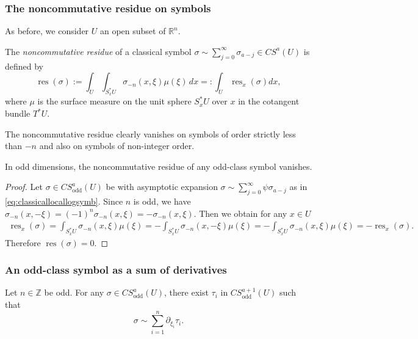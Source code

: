 \documentclass[pdftex]{sigma}
\DeclareMathOperator{\res}{res} \DeclareMathOperator{\Res}{Res}
\DeclareMathOperator{\odd}{odd} \DeclareMathOperator{\supp}{supp}
\newcommand{\R}{{\mathbb R}}
\newcommand{\Z}{{\mathbb Z}}
\begin{document}
\subsubsection{The noncommutative residue on symbols}

As before, we consider $U$ an open subset of $\R^n$.

\begin{definition}
The \emph{noncommutative residue} of a classical symbol $\sigma\sim\sum\limits_{j=0}^\infty\sigma_{a-j}\in CS^a(U)$ is def\/ined by
\[
\res(\sigma):=\int_U \int_{S_x^{*}U} \sigma_{-n}(x,\xi) \mu(\xi)\, dx=:\int_U \res_x(\sigma)dx,
\]
where $\mu$ is the surface measure on the unit sphere $S_x^{*}U$ over $x$ in the cotangent bundle $T^*U$.
\end{definition}
The noncommutative residue clearly vanishes on symbols of order strictly less than $-n$ and also on symbols of non-integer order.

\begin{lemma}\label{eq: nullityRES}
In odd dimensions, the noncommutative residue of any odd-class symbol vanishes.
\end{lemma}

\begin{proof}
Let $\sigma\in CS_{\odd}^a(U)$ be with asymptotic expansion $\sigma\sim\sum\limits_{j=0}^\infty\psi \sigma_{a-j}$ as in \eqref{eq:classicallocallogsymb}. Since $n$ is odd, we have $\sigma_{-n}(x,-\xi)=(-1)^{n}\sigma_{-n}(x,\xi)=-\sigma_{-n}(x,\xi)$. Then we obtain for any $x\in U$
\begin{gather*}
\res_x(\sigma)=\int_{S_x^{*}U}\!\!\sigma_{-n}(x,\xi)\mu(\xi)=-\int_{S_x^{*}U}\!\!\sigma_{-n}(x,-\xi)\mu(\xi)
=-\int_{S_x^{*}U}\!\!\sigma_{-n}(x,\xi)\mu(\xi)=-\res_x(\sigma).
\end{gather*}
Therefore $\res(\sigma)=0$.
\end{proof}

\subsubsection{An odd-class symbol as a sum of derivatives}

\begin{proposition}\label{prop:SymbolSumDerivatives}
Let $n\in\Z$ be odd. For any $\sigma\in CS_{\odd}^a(U)$, there exist $\tau_i$ in $CS_{\odd}^{a+1}(U)$ such that
\[
\sigma\sim\sum\limits_{i=1}^n\partial_{\xi_i}\tau_i.
\]
\end{proposition}
\end{document}
